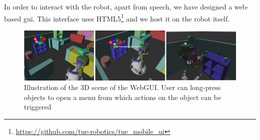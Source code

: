 \label{ssec:webgui}
In order to interact with the robot, apart from speech, we have designed a web-based \gls{gui}. This interface uses HTML5\footnote{\url{https://github.com/tue-robotics/tue_mobile_ui}} and we host it on the robot itself.

\begin{figure}[H]
	\includegraphics[width=\linewidth]{Figures/gui_actions}
	\caption{
		Illustration of the 3D scene of the WebGUI.
		User can long-press objects to open a menu from which actions on the object can be triggered
		}
	\label{fig:gui_actions}
\end{figure}
